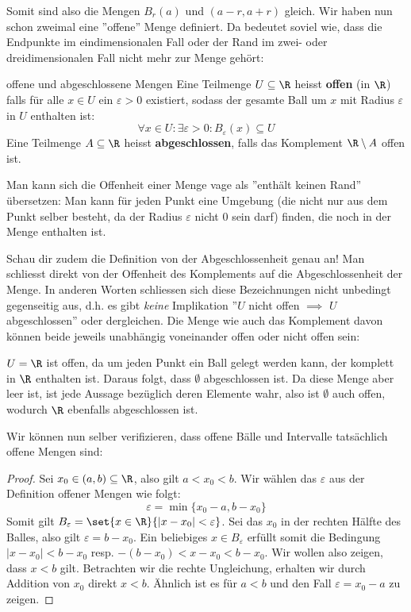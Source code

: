 Somit sind also die Mengen $B_r(a)$ und $(a-r, a+r)$ gleich. Wir haben nun schon zweimal eine ''offene'' Menge definiert. Da bedeutet soviel wie, dass die Endpunkte im eindimensionalen Fall oder der Rand im zwei- oder dreidimensionalen Fall nicht mehr zur Menge gehört:

\begin{definition}{offene und abgeschlossene Mengen}{}
Eine Teilmenge $U \subseteq \R$ heisst \textbf{offen} (in $\R$) falls für alle $x \in U$ ein $\varepsilon > 0$ existiert, sodass der gesamte Ball um $x$ mit Radius $\varepsilon$ in $U$ enthalten ist:
$$\forall x \in U: \exists \varepsilon > 0: B_\varepsilon(x) \subseteq U$$
Eine Teilmenge $A \subseteq \R$ heisst \textbf{abgeschlossen}, falls das Komplement $\R \setminus A$ offen ist.
\end{definition}

Man kann sich die Offenheit einer Menge vage als ''enthält keinen Rand'' übersetzen: Man kann für jeden Punkt eine Umgebung (die nicht nur aus dem Punkt selber besteht, da der Radius $\varepsilon$ nicht 0 sein darf) finden, die noch in der Menge enthalten ist.

Schau dir zudem die Definition von der Abgeschlossenheit genau an! Man schliesst direkt von der Offenheit des Komplements auf die Abgeschlossenheit der Menge. In anderen Worten schliessen sich diese Bezeichnungen nicht unbedingt gegenseitig aus, d.h. es gibt \textit{keine} Implikation ''$U$ nicht offen $\implies$ $U$ abgeschlossen'' oder dergleichen. Die Menge wie auch das Komplement davon können beide jeweils unabhängig voneinander offen oder nicht offen sein:

\begin{example}
$U = \R$ ist offen, da um jeden Punkt ein Ball gelegt werden kann, der komplett in $\R$ enthalten ist. Daraus folgt, dass $\emptyset$ abgeschlossen ist. Da diese Menge aber leer ist, ist jede Aussage bezüglich deren Elemente wahr, also ist $\emptyset$ auch offen, wodurch $\R$ ebenfalls abgeschlossen ist. 
\end{example}

Wir können nun selber verifizieren, dass offene Bälle und Intervalle tatsächlich offene Mengen sind:

\begin{proof} Sei $x_0 \in (a, b) \subseteq \R$, also gilt $a<x_0<b$. Wir wählen das $\varepsilon$ aus der Definition offener Mengen wie folgt:
$$\varepsilon = \min\{x_0-a, b-x_0\}$$
Somit gilt $B_\varepsilon = \set{x \in \R}{|x-x_0| < \varepsilon}$. Sei das $x_0$ in der rechten Hälfte des Balles, also gilt $\varepsilon = b-x_0$. Ein beliebiges $x \in B_\varepsilon$ erfüllt somit die Bedingung $|x-x_0| < b-x_0$ resp. $-(b-x_0) < x-x_0 < b-x_0$. Wir wollen also zeigen, dass $x < b$ gilt. Betrachten wir die rechte Ungleichung, erhalten wir durch Addition von $x_0$ direkt $x < b$. Ähnlich ist es für $a < b$ und den Fall $\varepsilon = x_0-a$ zu zeigen.
\end{proof}

